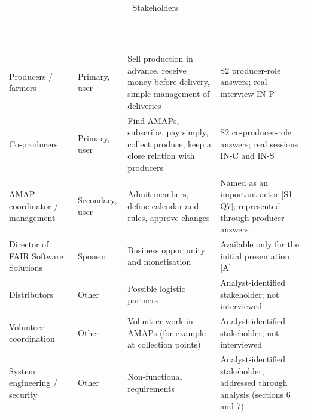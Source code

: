 \documentclass[11pt,a4paper]{article}
\begin{document}
{\footnotesize
\begin{longtable}{>{\raggedright\arraybackslash\hspace{0pt}}p{}>{\raggedright\arraybackslash\hspace{0pt}}p{}>{\raggedright\arraybackslash\hspace{0pt}}p{}>{\raggedright\arraybackslash\hspace{0pt}}p{}}
\caption{Stakeholders}\\
\rowcolor{hdr}\textcolor{white}{\textbf{Stakeholder}} & \textcolor{white}{\textbf{Type}} & \textcolor{white}{\textbf{Interest / role}} & \textcolor{white}{\textbf{Involvement}} \\ \endfirsthead
\rowcolor{hdr}\textcolor{white}{\textbf{Stakeholder}} & \textcolor{white}{\textbf{Type}} & \textcolor{white}{\textbf{Interest / role}} & \textcolor{white}{\textbf{Involvement}} \\ \endhead
Producers / farmers & Primary, user & Sell production in advance, receive money before delivery, simple management of deliveries & S2 producer-role answers; real interview IN-P \\ \hline
Co-producers & Primary, user & Find AMAPs, subscribe, pay simply, collect produce, keep a close relation with producers & S2 co-producer-role answers; real sessions IN-C and IN-S \\ \hline
AMAP coordinator / management & Secondary, user & Admit members, define calendar and rules, approve changes & Named as an important actor [S1-Q7]; represented through producer answers \\ \hline
Director of FAIR Software Solutions & Sponsor & Business opportunity and monetisation & Available only for the initial presentation [A] \\ \hline
Distributors & Other & Possible logistic partners & Analyst-identified stakeholder; not interviewed \\ \hline
Volunteer coordination & Other & Volunteer work in AMAPs (for example at collection points) & Analyst-identified stakeholder; not interviewed \\ \hline
System engineering / security & Other & Non-functional requirements & Analyst-identified stakeholder; addressed through analysis (sections 6 and 7) \\ \hline
\end{longtable}}
\end{document}
